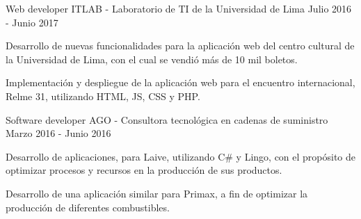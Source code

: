 \begin{cventries}
  \cventry
    {Web developer} %
    {ITLAB {\normalfont - Laboratorio de TI de la Universidad de Lima}} %
    {} %
    {Julio 2016 - Junio 2017} %
    {
      \begin{cvitems} %
        \item {Desarrollo de nuevas funcionalidades para la aplicación web del centro cultural de la Universidad de Lima, con el cual se vendió más de 10 mil boletos.}
        \item {Implementación y despliegue de la aplicación web para el encuentro internacional, Relme 31, utilizando HTML, JS, CSS y PHP.}
      \end{cvitems}
    }

  \cventry
    {Software developer} %
    {AGO {\normalfont - Consultora tecnológica en cadenas de suministro}} %
    {} %
    {Marzo 2016 - Junio 2016} %
    {
      \begin{cvitems} %
        \item {Desarrollo de aplicaciones, para Laive, utilizando C\# y Lingo, con el propósito de optimizar procesos y recursos en la producción de sus productos.}
        \item {Desarrollo de una aplicación similar para Primax, a fin de optimizar la producción de diferentes combustibles.}
      \end{cvitems}
    }

\end{cventries}
